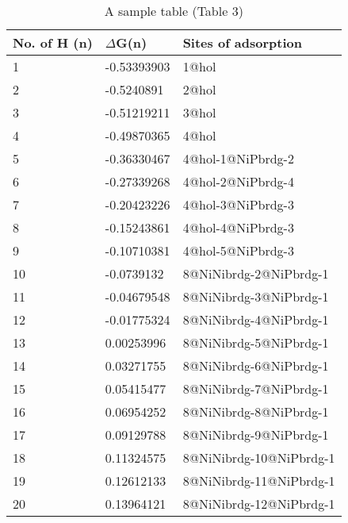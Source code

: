 
\begin{table}[ht]
\centering
\caption{A sample table (Table 3)}
\label{tab:table3}
\begin{tabular}{|l|l|l|}
\hline
No. of H (n) & $\Delta$G(n) & Sites of adsorption \\ \hline
1 & -0.53393903 & 1@hol \\ \hline
2 & -0.5240891 & 2@hol \\ \hline
3 & -0.51219211 & 3@hol \\ \hline
4 & -0.49870365 & 4@hol \\ \hline
5 & -0.36330467 & 4@hol-1@NiPbrdg-2 \\ \hline
6 & -0.27339268 & 4@hol-2@NiPbrdg-4 \\ \hline
7 & -0.20423226 & 4@hol-3@NiPbrdg-3 \\ \hline
8 & -0.15243861 & 4@hol-4@NiPbrdg-3 \\ \hline
9 & -0.10710381 & 4@hol-5@NiPbrdg-3 \\ \hline
10 & -0.0739132 & 8@NiNibrdg-2@NiPbrdg-1 \\ \hline
11 & -0.04679548 & 8@NiNibrdg-3@NiPbrdg-1 \\ \hline
12 & -0.01775324 & 8@NiNibrdg-4@NiPbrdg-1 \\ \hline
13 & 0.00253996 & 8@NiNibrdg-5@NiPbrdg-1 \\ \hline
14 & 0.03271755 & 8@NiNibrdg-6@NiPbrdg-1 \\ \hline
15 & 0.05415477 & 8@NiNibrdg-7@NiPbrdg-1 \\ \hline
16 & 0.06954252 & 8@NiNibrdg-8@NiPbrdg-1 \\ \hline
17 & 0.09129788 & 8@NiNibrdg-9@NiPbrdg-1 \\ \hline
18 & 0.11324575 & 8@NiNibrdg-10@NiPbrdg-1 \\ \hline
19 & 0.12612133 & 8@NiNibrdg-11@NiPbrdg-1 \\ \hline
20 & 0.13964121 & 8@NiNibrdg-12@NiPbrdg-1 \\ \hline

\end{tabular}
\end{table}
